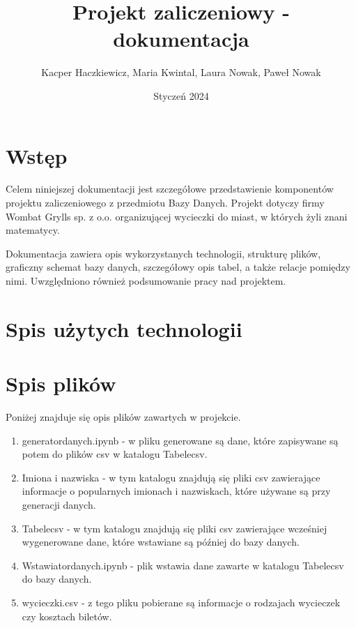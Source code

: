 \documentclass{article}
\author{Kacper Haczkiewicz, Maria Kwintal, Laura Nowak, Paweł Nowak}
\title{\textbf{Projekt zaliczeniowy - dokumentacja}}
\date{Styczeń 2024}
\begin{document}
	
	\maketitle
	
	\section{Wstęp}
	
	Celem niniejszej dokumentacji jest szczegółowe przedstawienie komponentów projektu zaliczeniowego z przedmiotu Bazy Danych. Projekt dotyczy firmy Wombat Grylls sp. z o.o. organizującej wycieczki do miast, w których żyli znani matematycy.
	
	Dokumentacja zawiera opis wykorzystanych technologii, strukturę plików, graficzny schemat bazy danych, szczegółowy opis tabel, a także relacje pomiędzy nimi. Uwzględniono również podsumowanie pracy nad projektem.
	
	\section{Spis użytych technologii}
	
	\section{Spis plików}
	
	Poniżej znajduje się opis plików zawartych w projekcie.
	\begin{enumerate}
		\item generator\textunderscore danych.ipynb - w pliku generowane są dane, które zapisywane są potem do plików csv w katalogu Tabele\textunderscore csv.
		\item Imiona i nazwiska - w tym katalogu znajdują się pliki csv zawierające informacje o popularnych imionach i nazwiskach, które używane są przy generacji danych.
		\item Tabele\textunderscore csv - w tym katalogu znajdują się pliki csv zawierające wcześniej wygenerowane dane, które wstawiane są później do bazy danych.
		\item Wstawiator\textunderscore danych.ipynb - plik wstawia dane zawarte w katalogu Tabele\textunderscore csv do bazy danych.
		\item wycieczki.csv - z tego pliku pobierane są informacje o rodzajach wycieczek czy kosztach biletów.
		
	\end{enumerate}
	
\end{document}

